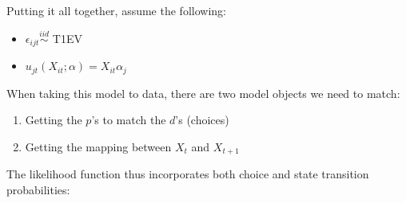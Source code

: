 \documentclass[aspectratio=169]{beamer}
\begin{document}
\begin{frame}
Putting it all together, assume the following: 
\bigskip{}

\begin{itemize}
\itemsep1.5em
    \item $\epsilon_{ijt}\overset{iid}{\sim}$ T1EV
    \item $u_{jt}\left(X_{it};\alpha\right) = X_{it}\alpha_j$
\end{itemize}
\bigskip{}


\end{frame}




\begin{frame}

When taking this model to data, there are two model objects we need to match:
\bigskip{}

\begin{enumerate}
\itemsep1.5em
    \item Getting the $p$'s to match the $d$'s (choices)
    \item Getting the mapping between $X_t$ and $X_{t+1}$
\end{enumerate}


\end{frame}




\begin{frame}

The likelihood function thus incorporates both choice and state transition probabilities:



\bigskip{}


\end{frame}
\end{document}
